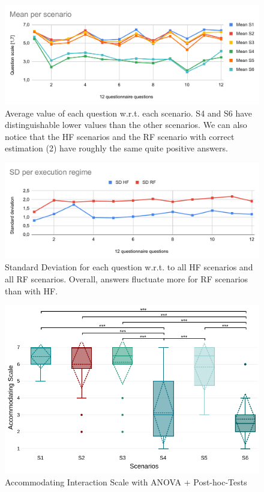 \begin{figure}
    \includegraphics[width=\linewidth]{images/Chapter5/Mean per scenario.pdf}
    \caption{Average value of each question w.r.t. each scenario. S4 and S6 have distinguishable lower values than the other scenarios. We can also notice that the HF scenarios and the RF scenario with correct estimation (2) have roughly the same quite positive answers.}
    \label{fig:mean_per_scenario}
\end{figure}

\begin{figure}
    \includegraphics[width=\linewidth]{images/Chapter5/SD per execution regime.pdf}
    \caption{Standard Deviation for each question w.r.t. to all HF scenarios and all RF scenarios. Overall, answers fluctuate more for RF scenarios than with HF.}
    \label{fig:sd_per_execution_regime}
\end{figure}

\begin{figure}
    \centering
    \includegraphics[width=\linewidth]{images/Chapter5/signif_accommo.pdf}
    \caption{Accommodating Interaction Scale with ANOVA + Post-hoc-Tests}
    \label{fig:accommodating_scale_anova}
\end{figure}

